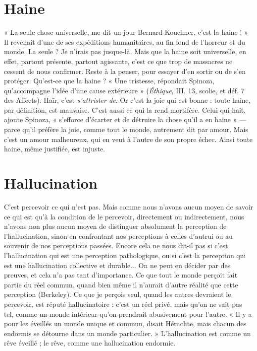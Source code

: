 \section{Haine}
« La seule chose universelle, me dit un jour Bernard Kouchner,
c’est la haine ! » Il revenait d’une de ses expéditions humanitaires,
au fin fond de l’horreur et du monde. La seule ? Je n’irais pas jusque-là. Mais
que la haine soit universelle, en effet, partout présente, partout agissante, c’est
ce que trop de massacres ne cessent de nous confirmer. Reste à la penser, pour
essayer d’en sortir ou de s’en protéger. Qu'est-ce que la haine ? « Une tristesse,
répondait Spinoza, qu’accompagne l’idée d’une cause extérieure » ({\it Éthique}, III,
13, scolie, et déf. 7 des Affects). Haïr, c’est {\it s'attrister de}. Or c’est la joie qui est
bonne : toute haine, par définition, est mauvaise. C’est aussi ce qui la rend
mortifère. Celui qui hait, ajoute Spinoza, « s'efforce d’écarter et de détruire la
chose qu’il a en haine » — parce qu’il préfère la joie, comme tout le monde,
autrement dit par amour. Mais c’est un amour malheureux, qui en veut à
l’autre de son propre échec. Ainsi toute haine, même justifiée, est injuste.

\section{Hallucination}
C'est percevoir ce qui n’est pas. Mais comme nous
n'avons aucun moyen de savoir ce qui est qu’à la
condition de le percevoir, directement ou indirectement, nous n’avons non
plus aucun moyen de distinguer absolument la perception de l’hallucination,
sinon en confrontant nos perceptions à celles d’autrui ou au souvenir de nos
perceptions passées. Encore cela ne nous dit-il pas si c’est l’hallucination qui est
une perception pathologique, ou si c’est la perception qui est une hallucination
collective et durable... On ne peut en décider par des preuves, et cela n’a pas
tant d'importance. Ce que tout le monde perçoit fait partie du réel commun,
quand bien même il n’aurait d’autre réalité que cette perception (Berkeley). Ce
que je perçois seul, quand les autres devraient le percevoir, est réputé
hallucinatoire : c’est un réel privé, mais qu’on ne sait pas tel, comme un monde
intérieur qu’on prendrait abusivement pour l’autre. « Il y a pour les éveillés un
monde unique et commun, disait Héraclite, mais chacun des endormis se
détourne dans un monde particulier. » L’hallucination est comme un rêve
éveillé ; le rêve, comme une hallucination endormie.

